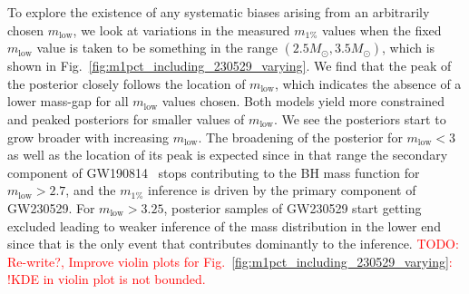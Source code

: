 \documentclass[modern]{aastex631}
\newcommand{\todo}[1]{\textcolor{red}{TODO: #1}}
\begin{document}
To explore the existence of any systematic biases arising from an arbitrarily chosen $m_\mathrm{low}$, we look at variations in the measured $m_{1\%}$ values when the fixed $m_\mathrm{low}$ value is taken to be something in the range $(2.5M_{\odot},3.5M_{\odot})$, which is shown in Fig.~\ref{fig:m1pct_including_230529_varying}. We find that the peak of the posterior closely follows the location of $m_\mathrm{low}$, which indicates the absence of a lower mass-gap for all $m_\mathrm{low}$ values chosen. Both models yield more constrained and peaked posteriors for smaller values of $m_{\mathrm{low}}$. We see the posteriors start to grow broader with increasing $m_\mathrm{low}$. The broadening of the posterior for $m_\mathrm{low}<3$ as well as the location of its peak is expected since in that range the secondary component of GW190814~\citep{LIGOScientific:2020zkf} stops contributing to the BH mass function for $m_\mathrm{low}>2.7$, and the $m_{1\%}$ inference is driven by the primary component of GW230529. For  $m_\mathrm{low}>3.25$, posterior samples of GW230529 start getting excluded leading to weaker inference of the mass distribution in the lower end since that is the only event that contributes dominantly to the inference. \todo{Re-write?, Improve violin plots for Fig.~\ref{fig:m1pct_including_230529_varying}: !KDE in violin plot is not bounded.}


\end{document}

